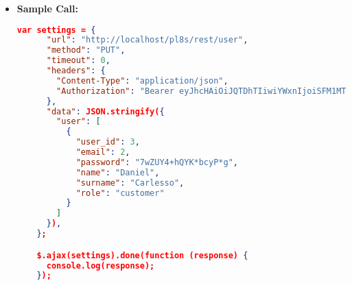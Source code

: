 \begin{itemize}
\begin{itemize}
\begin{lstlisting}[language=json]
        }
    }
			\end{lstlisting}
		\end{itemize}	
    	\begin{itemize}
			\item[$\circ$] \textbf{Code:} 401 Unauthorized
			\item[] \textbf{Content:}
			\begin{lstlisting}[language=json]
    {
        "message": {
            "message": "Cannot authenticate the user.",
            "error-code": "EF01",
            "error-details": "JWT expired."
        }
    }
			\end{lstlisting}
		\end{itemize}		
    	\begin{itemize}
			\item[$\circ$] \textbf{Code:} 500 Internal Server Error
			\item[] \textbf{Content:}
			\begin{lstlisting}[language=json]
    {
        "message": {
            "message": "Cannot update the user",
            "error-code": "ED00",
            "error-details": "Cannot update user: unexpected DB error."
        }
    }
			\end{lstlisting}
  
 
		\end{itemize}
    \item \textbf{Sample Call:}
		\begin{lstlisting}[language=json]		
    var settings = {
      "url": "http://localhost/pl8s/rest/user",
      "method": "PUT",
      "timeout": 0,
      "headers": {
        "Content-Type": "application/json",
        "Authorization": "Bearer eyJhcHAiOiJQTDhTIiwiYWxnIjoiSFM1MTIifQ.eyJ1aWQiOjMsInJvbCI6ImN1c3Rv bWVyIiwic3RyIjoiY3VzX1B3OHJKbmd5eldOcmZ5IiwiZGF0IjoxNzE0Mjg0NjAyNzc 4fQ._buJbO5joz8J8j-DlaoQfG7i7lHRrPae05n63TNPwMXfmSKF0zmyjS0exIQpILn VERLVAAD8fS4mCTBkmeYD7A"
      },
      "data": JSON.stringify({
        "user": [
          {
            "user_id": 3,
            "email": 2,
            "password": "7wZUY4+hQYK*bcyP*g",
            "name": "Daniel",
            "surname": "Carlesso",
            "role": "customer"
          }
        ]
      }),
    };

    $.ajax(settings).done(function (response) {
      console.log(response);
    });
	\end{lstlisting}
  \end{itemize}		
